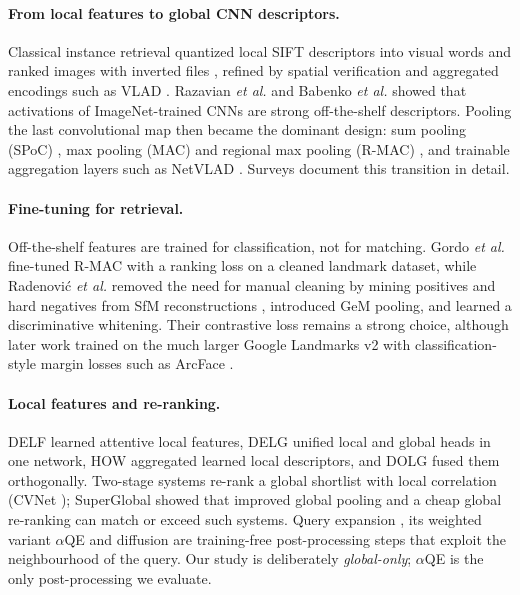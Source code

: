 \documentclass[runningheads]{llncs}
\newcommand{\aqe}{$\alpha$QE}
\begin{document}
\paragraph{From local features to global CNN descriptors.}
Classical instance retrieval quantized local SIFT descriptors
\cite{lowe2004sift} into visual words and ranked images with inverted files
\cite{sivic2003video}, refined by spatial verification
\cite{philbin2007oxford,philbin2008paris} and aggregated encodings such as VLAD
\cite{jegou2010vlad}. Razavian \emph{et al.} \cite{razavian2014cnn} and
Babenko \emph{et al.} \cite{babenko2014neural} showed that activations of
ImageNet-trained CNNs are strong off-the-shelf descriptors. Pooling the last
convolutional map then became the dominant design: sum pooling (SPoC)
\cite{babenko2015spoc}, max pooling (MAC) and regional max pooling (R-MAC)
\cite{tolias2016rmac}, and trainable aggregation layers such as NetVLAD
\cite{arandjelovic2016netvlad}. Surveys
\cite{zheng2018sift,chen2023instance,srivastava2023cbir} document this
transition in detail.

\paragraph{Fine-tuning for retrieval.}
Off-the-shelf features are trained for classification, not for matching.
Gordo \emph{et al.} \cite{gordo2017endtoend} fine-tuned R-MAC with a ranking
loss on a cleaned landmark dataset, while Radenovi{\'c} \emph{et al.}
\cite{radenovic2016cnn,radenovic2019gem} removed the need for manual cleaning
by mining positives and hard negatives from SfM reconstructions
\cite{schonberger2015sfm}, introduced GeM pooling, and learned a
discriminative whitening. Their contrastive loss \cite{hadsell2006contrastive}
remains a strong choice, although later work trained on the much larger Google
Landmarks v2 \cite{weyand2020gldv2} with classification-style margin losses
such as ArcFace \cite{deng2019arcface}.

\paragraph{Local features and re-ranking.}
DELF \cite{noh2017delf} learned attentive local features, DELG
\cite{cao2020delg} unified local and global heads in one network, HOW
\cite{tolias2020how} aggregated learned local descriptors, and DOLG
\cite{yang2021dolg} fused them orthogonally. Two-stage systems re-rank a global
shortlist with local correlation (CVNet \cite{lee2022cvnet}); SuperGlobal
\cite{shao2023superglobal} showed that improved global pooling and a cheap
global re-ranking can match or exceed such systems. Query expansion
\cite{chum2007totalrecall,arandjelovic2012three}, its weighted variant
$\alpha$QE \cite{radenovic2019gem} and diffusion \cite{iscen2017diffusion}
are training-free post-processing steps that exploit the neighbourhood of the
query. Our study is deliberately \emph{global-only}; \aqe{} is the only
post-processing we evaluate.
\end{document}
